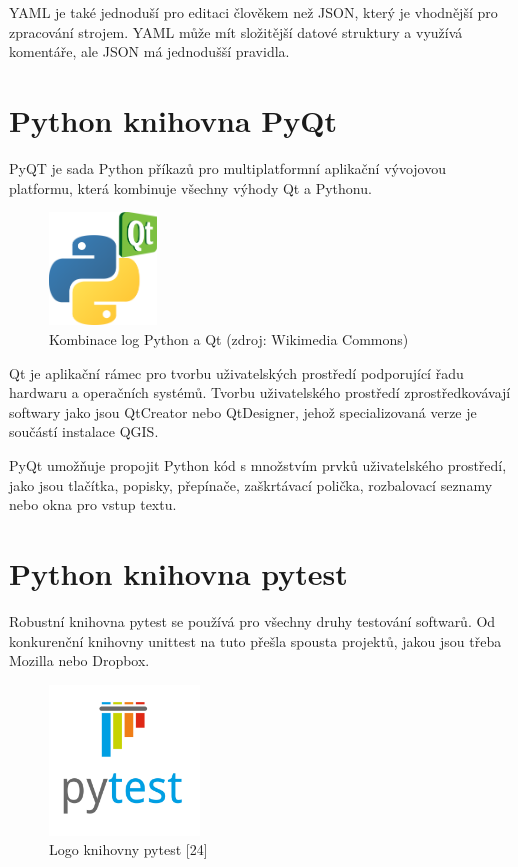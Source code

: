 \documentclass[a4paper,oneside,12pt]{book}
\begin{document}
\hspace{10mm}YAML je také jednoduší pro editaci člověkem než JSON, který je vhodnější pro zpracování strojem. YAML může mít složitější datové struktury a využívá komentáře, ale JSON má jednodušší pravidla. \cite{hsOq0virmVAO85Ud}


\section{Python knihovna PyQt} \label{pyqt}
\hspace{10mm}PyQT je sada Python příkazů pro multiplatformní aplikační vývojovou platformu, která kombinuje všechny výhody Qt a Pythonu.  \cite{Summerfield2007}

\begin{figure}[ht] \label{obr8}
\centering
\includegraphics[height=3cm]{pictures/Python_and_Qt.png}
\caption{Kombinace log Python a Qt  (zdroj: Wikimedia Commons)}
\label{fig:qt}
\end{figure}

\hspace{10mm}Qt je aplikační rámec pro tvorbu uživatelských prostředí podporující řadu hardwaru a operačních systémů. Tvorbu uživatelského prostředí zprostředkovávají softwary jako jsou QtCreator nebo QtDesigner, jehož specializovaná verze je součástí instalace QGIS.

\hspace{10mm}PyQt umožňuje propojit Python kód s množstvím prvků uživatelského prostředí, jako jsou tlačítka, popisky, přepínače, zaškrtávací polička, rozbalovací seznamy nebo okna pro vstup textu.

\section{Python knihovna pytest} \label{pytest}
\hspace{10mm}Robustní knihovna pytest se používá pro všechny druhy testování softwarů. Od konkurenční knihovny unittest na tuto přešla spousta projektů, jakou jsou třeba Mozilla nebo Dropbox. \cite{Okken2017}

\begin{figure}[ht] \label{obr9}
\centering
\includegraphics[height=4cm]{pictures/Pytest_logo.png}
\caption{Logo knihovny pytest [24]}
\label{fig:pytest}
\end{figure}
\end{document}
